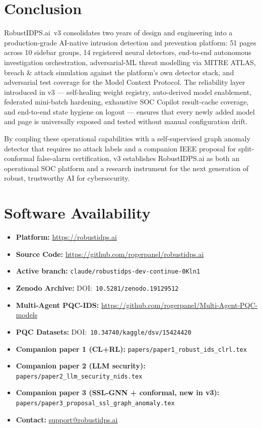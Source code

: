 \documentclass[11pt,a4paper]{article}
\begin{document}
\section{Conclusion}
\label{sec:conclusion}

RobustIDPS.ai~v3 consolidates two years of design and engineering
into a production-grade AI-native intrusion detection and prevention
platform: 51 pages across 10 sidebar groups, 14 registered neural
detectors, end-to-end autonomous investigation orchestration,
adversarial-ML threat modelling via MITRE ATLAS, breach \& attack
simulation against the platform's own detector stack, and adversarial
test coverage for the Model Context Protocol.  The reliability layer
introduced in v3 --- self-healing weight registry, auto-derived
model enablement, federated mini-batch hardening, exhaustive SOC
Copilot result-cache coverage, and end-to-end state hygiene on
logout --- ensures that every newly added model and page is
universally exposed and tested without manual configuration drift.

By coupling these operational capabilities with a self-supervised
graph anomaly detector that requires no attack labels and a
companion IEEE proposal for split-conformal false-alarm certification,
v3 establishes RobustIDPS.ai as both an operational SOC platform and
a research instrument for the next generation of robust, trustworthy
AI for cybersecurity.

\section*{Software Availability}

\begin{itemize}
  \item \textbf{Platform:} \url{https://robustidps.ai}
  \item \textbf{Source Code:} \url{https://github.com/rogerpanel/robustidps.ai}
  \item \textbf{Active branch:} \texttt{claude/robustidps-dev-continue-0Kln1}
  \item \textbf{Zenodo Archive:} DOI:~\texttt{10.5281/zenodo.19129512}
  \item \textbf{Multi-Agent PQC-IDS:} \url{https://github.com/rogerpanel/Multi-Agent-PQC-models}
  \item \textbf{PQC Datasets:} DOI:~\texttt{10.34740/kaggle/dsv/15424420}
  \item \textbf{Companion paper 1 (CL+RL):} \texttt{papers/paper1\_robust\_ids\_clrl.tex}
  \item \textbf{Companion paper 2 (LLM security):} \texttt{papers/paper2\_llm\_security\_nids.tex}
  \item \textbf{Companion paper 3 (SSL-GNN + conformal, new in v3):} \texttt{papers/paper3\_proposal\_ssl\_graph\_anomaly.tex}
  \item \textbf{Contact:} \href{mailto:support@robustidps.ai}{support@robustidps.ai}
\end{itemize}
\end{document}
